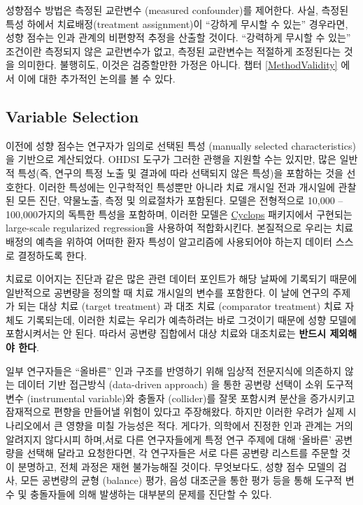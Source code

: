 \documentclass[11pt]{book}
\theoremstyle{definition}
\theoremstyle{definition}
\theoremstyle{definition}
\theoremstyle{remark}
\let\BeginKnitrBlock\begin \let\EndKnitrBlock\end
\begin{document}
성향점수 방법은 측정된 교란변수 (measured confounder)를 제어한다. 사실,
측정된 특성 하에서 치료배정(treatment assignment)이 ``강하게 무시할 수
있는'' 경우라면, 성향 점수는 인과 관계의 비편향적 추정을 산출할 것이다.
``강력하게 무시할 수 있는'' 조건이란 측정되지 않은 교란변수가 없고,
측정된 교란변수는 적절하게 조정된다는 것을 의미한다. 불행히도, 이것은
검증할만한 가정은 아니다. 챕터 \ref{MethodValidity} 에서 이에 대한
추가적인 논의를 볼 수 있다. 

\subsection{Variable Selection}\label{VariableSelection}

이전에 성향 점수는 연구자가 임의로 선택된 특성 (manually selected
characteristics) 을 기반으로 계산되었다. OHDSI 도구가 그러한 관행을
지원할 수는 있지만, 많은 일반적 특성(즉, 연구의 특정 노출 및 결과에 따라
선택되지 않은 특성)을 포함하는 것을 선호한다. \citep{tian_2018} 이러한
특성에는 인구학적인 특성뿐만 아니라 치료 개시일 전과 개시일에 관찰된
모든 진단, 약물노출, 측정 및 의료절차가 포함된다. 모델은 전형적으로
10,000 -- 100,000가지의 독특한 특성을 포함하며, 이러한 모델은
\href{https://ohdsi.github.io/Cyclops/}{Cyclops} 패키지에서 구현되는
large-scale regularized regression\citep{suchard_2013}을 사용하여
적합화시킨다. 본질적으로 우리는 치료 배정의 예측을 위하여 어떠한 환자
특성이 알고리즘에 사용되어야 하는지 데이터 스스로 결정하도록 한다.

\BeginKnitrBlock{rmdimportant}
치료로 이어지는 진단과 같은 많은 관련 데이터 포인트가 해당 날짜에
기록되기 때문에 일반적으로 공변량을 정의할 때 치료 개시일의 변수를
포함한다. 이 날에 연구의 주제가 되는 대상 치료 (target treatment) 과
대조 치료 (comparator treatment) 치료 자체도 기록되는데, 이러한 치료는
우리가 예측하려는 바로 그것이기 때문에 성향 모델에 포함시켜서는 안 된다.
따라서 공변량 집합에서 대상 치료와 대조치료는 \textbf{반드시 제외해야
한다}.
\EndKnitrBlock{rmdimportant}

일부 연구자들은 ``올바른'' 인과 구조를 반영하기 위해 임상적 전문지식에
의존하지 않는 데이터 기반 접근방식 (data-driven approach) 을 통한 공변량
선택이 소위 도구적 변수 (instrumental variable)와 충돌자 (collider)를
잘못 포함시켜 분산을 증가시키고 잠재적으로 편향을 만들어낼 위험이 있다고
주장해왔다.\citep{hernan_2002} 하지만 이러한 우려가 실제 시나리오에서 큰
영향을 미칠 가능성은 적다.\citep{schneeweiss_2018} 게다가, 의학에서
진정한 인과 관계는 거의 알려지지 않다시피 하며,서로 다른 연구자들에게
특정 연구 주제에 대해 `올바른' 공변량을 선택해 달라고 요청한다면, 각
연구자들은 서로 다른 공변량 리스트를 주문할 것이 분명하고, 전체 과정은
재현 불가능해질 것이다. 무엇보다도, 성향 점수 모델의 검사, 모든 공변량의
균형 (balance) 평가, 음성 대조군을 통한 평가 등을 통해 도구적 변수 및
충돌자들에 의해 발생하는 대부분의 문제를 진단할 수 있다.
 
\end{document}
